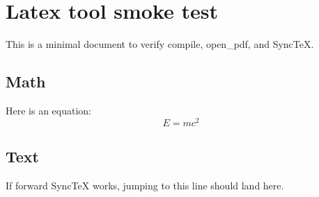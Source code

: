 \documentclass{article}
\begin{document}
\section{Latex tool smoke test}
This is a minimal document to verify compile, open\_pdf, and SyncTeX.

\subsection{Math}
Here is an equation:
\[
E = mc^2
\]

\subsection{Text}
If forward SyncTeX works, jumping to this line should land here.
\end{document}
